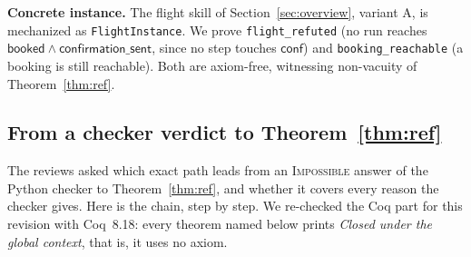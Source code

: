 \documentclass{article}
\theoremstyle{plain}
\theoremstyle{definition}
\newcommand{\id}[1]{\texttt{#1}}
\newcommand{\bnew}{\begingroup\color{revblue}}
\newcommand{\bnew}{\begingroup}
\begin{document}
\noindent\textbf{Concrete instance.} The flight skill of
Section~\ref{sec:overview}, variant A, is
mechanized as \id{FlightInstance}. We prove \id{flight\_refuted} (no run reaches
$\mathsf{booked}\wedge\mathsf{confirmation\_sent}$, since no step touches
$\mathsf{conf}$) and \id{booking\_reachable} (a booking is still reachable). Both
are axiom-free, witnessing non-vacuity of Theorem~\ref{thm:ref}.

\bnew
\subsection{From a checker verdict to Theorem~\ref{thm:ref}}\label{sec:chain}
The reviews asked which exact path leads from an \textsc{Impossible} answer of
the Python checker to Theorem~\ref{thm:ref}, and whether it covers every
reason the checker gives. Here is the chain, step by step. We re-checked the
Coq part for this revision with Coq~8.18: every theorem named below prints
\emph{Closed under the global context}, that is, it uses no axiom.
\end{document}
